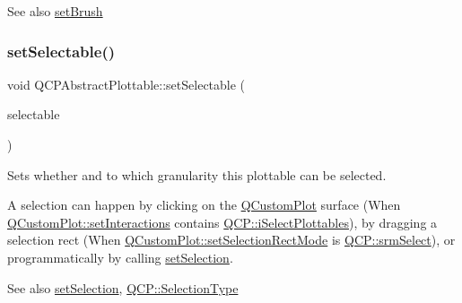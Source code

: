\begin{DoxySeeAlso}{See also}
\hyperlink{classQCPAbstractPlottable_a7a4b92144dca6453a1f0f210e27edc74}{set\+Brush} 
\end{DoxySeeAlso}
\mbox{\label{classQCPAbstractPlottable_ac238d6e910f976f1f30d41c2bca44ac3}} 
\subsubsection{\texorpdfstring{set\+Selectable()}{setSelectable()}}
{\footnotesize\ttfamily void Q\+C\+P\+Abstract\+Plottable\+::set\+Selectable (\begin{DoxyParamCaption}\item[{\hyperlink{namespaceQCP_ac6cb9db26a564b27feda362a438db038}{Q\+C\+P\+::\+Selection\+Type}}]{selectable }\end{DoxyParamCaption})}

Sets whether and to which granularity this plottable can be selected.

A selection can happen by clicking on the \hyperlink{classQCustomPlot}{Q\+Custom\+Plot} surface (When \hyperlink{classQCustomPlot_a5ee1e2f6ae27419deca53e75907c27e5}{Q\+Custom\+Plot\+::set\+Interactions} contains \hyperlink{namespaceQCP_a2ad6bb6281c7c2d593d4277b44c2b037a67148c8227b4155eca49135fc274c7ec}{Q\+C\+P\+::i\+Select\+Plottables}), by dragging a selection rect (When \hyperlink{classQCustomPlot_a810ef958ebe84db661c7288b526c0deb}{Q\+Custom\+Plot\+::set\+Selection\+Rect\+Mode} is \hyperlink{namespaceQCP_ac9aa4d6d81ac76b094f9af9ad2d3aacfa62c286e8da283a0cbb88ecac2f3f7506}{Q\+C\+P\+::srm\+Select}), or programmatically by calling \hyperlink{classQCPAbstractPlottable_a219bc5403a9d85d3129165ec3f5ae436}{set\+Selection}.

\begin{DoxySeeAlso}{See also}
\hyperlink{classQCPAbstractPlottable_a219bc5403a9d85d3129165ec3f5ae436}{set\+Selection}, \hyperlink{namespaceQCP_ac6cb9db26a564b27feda362a438db038}{Q\+C\+P\+::\+Selection\+Type} 
\end{DoxySeeAlso}
\mbox{\label{classQCPAbstractPlottable_a219bc5403a9d85d3129165ec3f5ae436}} 
